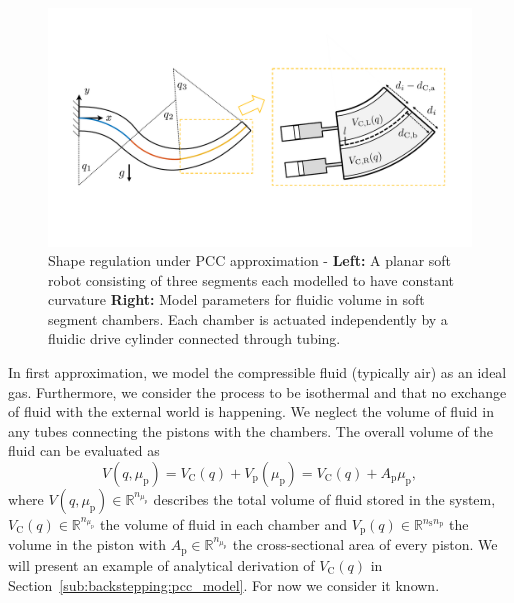 \begin{figure}[ht]
  \centering
  \includegraphics[width=0.9\columnwidth]{backstepping/figures/backstepping_graphics_pcc_case_overview_v4_cropped.pdf}
  \caption{Shape regulation under \gls{PCC} approximation - \textbf{Left:} A planar soft robot consisting of three segments each modelled to have constant curvature \textbf{Right:} Model parameters for fluidic volume in soft segment chambers. Each chamber is actuated independently by a fluidic drive cylinder connected through tubing.}\label{fig:backstepping:pcc_case_overview}
\end{figure}


In first approximation, we model the compressible fluid (typically air) as an ideal gas. Furthermore, we consider the process to be isothermal and that no exchange of fluid with the external world is happening. We neglect the volume of fluid in any tubes connecting the pistons with the chambers.
%
The overall volume of the fluid can be evaluated as %
%
\begin{equation}
V(q,\mu_\mathrm{p}) = V_{\mathrm{C}}(q) + V_{\mathrm{p}}(\mu_{\mathrm{p}}) = V_{\mathrm{C}}(q) + A_{\mathrm{p}} \mu_{\mathrm{p}}, 
\end{equation}
%
where $V(q,\mu_\mathrm{p}) \in \mathbb{R}^{n_{\mu_\mathrm{p}}}$ describes the total volume of fluid stored in the system, $V_{\mathrm{C}}(q) \in \mathbb{R}^{n_{\mu_\mathrm{p}}}$ the volume of fluid in each chamber and $V_{\mathrm{p}}(q) \in \mathbb{R}^{n_{\mathrm{S}} n_{\mathrm{p}}}$ the volume in the piston with $A_{\mathrm{p}} \in \mathbb{R}^{n_{\mu_\mathrm{p}}}$ the cross-sectional area of every piston.
%
%
We will present an example of analytical derivation of $V_{\mathrm{C}}(q)$ in Section~\ref{sub:backstepping:pcc_model}.
For now we consider it known.

